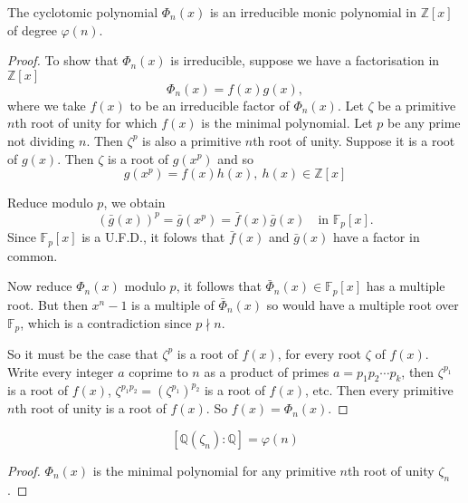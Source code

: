 \documentclass[a4paper]{article}
\begin{document}
\begin{theorem}
  The cyclotomic polynomial $\Phi_n(x)$ is an irreducible monic polynomial in $\mathbb Z[x]$ of degree $\varphi(n)$.
\end{theorem}

\begin{proof}
  To show that $\Phi_n(x)$ is irreducible, suppose we have a factorisation in $\mathbb Z[x]$
  \[ \Phi_n(x) = f(x)g(x), \]
  where we take $f(x)$ to be an irreducible factor of $\Phi_n(x)$. Let $\zeta$ be a primitive $n$th root of unity for which $f(x)$ is the minimal polynomial. Let $p$ be any prime not dividing $n$. Then $\zeta^p$ is also a primitive $n$th root of unity. Suppose it is a root of $g(x)$. Then $\zeta$ is a root of $g(x^p)$ and so
  \[ g(x^p) = f(x)h(x), \: h(x) \in \mathbb Z[x] \]

  Reduce modulo $p$, we obtain
  \[ (\bar g(x))^p = \bar g(x^p) = \bar f(x) \bar g(x) \quad \text{in } \mathbb F_p[x]. \]
  Since $\mathbb F_p[x]$ is a U.F.D., it folows that $\bar f(x)$ and $\bar g(x)$ have a factor in common.

  Now reduce $\Phi_n(x)$ modulo $p$, it follows that $\bar \Phi_n(x) \in \mathbb F_p[x]$ has a multiple root. But then $x^n-1$ is a multiple of $\bar \Phi_n(x)$ so would have a multiple root over $\mathbb F_p$, which is a contradiction since $p \nmid n$.

  So it must be the case that $\zeta^p$ is a root of $f(x)$, for every root $\zeta$ of $f(x)$. Write every integer $a$ coprime to $n$ as a product of primes $a = p_1p_2\cdots p_k$, then $\zeta^{p_1}$ is a root of $f(x)$, $\zeta^{p_1p_2} = (\zeta^{p_1})^{p_2}$ is a root of $f(x)$, etc. Then every primitive $n$th root of unity is a root of $f(x)$. So $f(x) = \Phi_n(x)$.
\end{proof}

\begin{corollary}
  \[ [\mathbb Q(\zeta_n): \mathbb Q] = \varphi(n) \]
\end{corollary}

\begin{proof}
  $\Phi_n(x)$ is the minimal polynomial for any primitive $n$th root of unity $\zeta_n$.
\end{proof}
\end{document}
